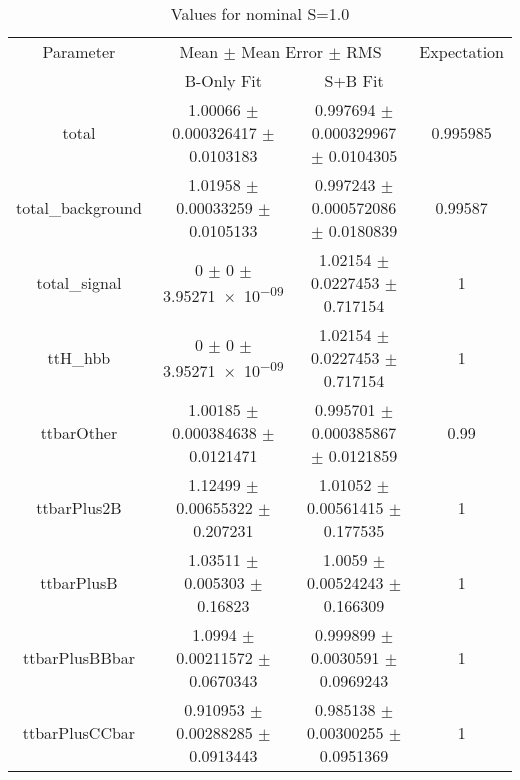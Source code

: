 \begin{table}
\centering
\caption{Values for nominal S=1.0}
\begin{tabular}{cccc}
\toprule
Parameter & \multicolumn{2}{c}{Mean $\pm$ Mean Error $\pm$ RMS} & Expectation\\
 & B-Only Fit & S+B Fit & \\
\midrule
total & \num{1.00066} $\pm$ \num{0.000326417} $\pm$ \num{0.0103183} & \num{0.997694} $\pm$ \num{0.000329967} $\pm$ \num{0.0104305} & \num{0.995985}\\
total\_background & \num{1.01958} $\pm$ \num{0.00033259} $\pm$ \num{0.0105133} & \num{0.997243} $\pm$ \num{0.000572086} $\pm$ \num{0.0180839} & \num{0.99587}\\
total\_signal & \num{0} $\pm$ \num{0} $\pm$ \num{3.95271e-09} & \num{1.02154} $\pm$ \num{0.0227453} $\pm$ \num{0.717154} & \num{1}\\
ttH\_hbb & \num{0} $\pm$ \num{0} $\pm$ \num{3.95271e-09} & \num{1.02154} $\pm$ \num{0.0227453} $\pm$ \num{0.717154} & \num{1}\\
ttbarOther & \num{1.00185} $\pm$ \num{0.000384638} $\pm$ \num{0.0121471} & \num{0.995701} $\pm$ \num{0.000385867} $\pm$ \num{0.0121859} & \num{0.99}\\
ttbarPlus2B & \num{1.12499} $\pm$ \num{0.00655322} $\pm$ \num{0.207231} & \num{1.01052} $\pm$ \num{0.00561415} $\pm$ \num{0.177535} & \num{1}\\
ttbarPlusB & \num{1.03511} $\pm$ \num{0.005303} $\pm$ \num{0.16823} & \num{1.0059} $\pm$ \num{0.00524243} $\pm$ \num{0.166309} & \num{1}\\
ttbarPlusBBbar & \num{1.0994} $\pm$ \num{0.00211572} $\pm$ \num{0.0670343} & \num{0.999899} $\pm$ \num{0.0030591} $\pm$ \num{0.0969243} & \num{1}\\
ttbarPlusCCbar & \num{0.910953} $\pm$ \num{0.00288285} $\pm$ \num{0.0913443} & \num{0.985138} $\pm$ \num{0.00300255} $\pm$ \num{0.0951369} & \num{1}\\
\bottomrule
\end{tabular}
\end{table}